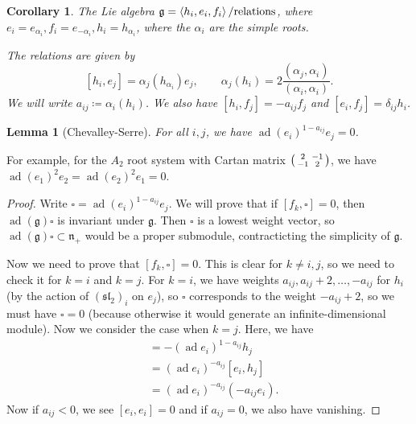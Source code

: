 \documentclass[leqno, openany]{memoir}
\newtheorem{cor}[thm]{Corollary}
\newtheorem{lem}[thm]{Lemma}
\theoremstyle{definition}
\theoremstyle{remark}
\theoremstyle{plain}
\theoremstyle{definition}
\theoremstyle{remark}
\newcommand{\mf}[1]{\mathfrak{#1}}
\DeclareMathOperator{\ad}{ad}
\begin{document}
\begin{cor} The Lie algebra $\mf{g} = \ev{h_i, e_i, f_i} / \text{relations}$,
    where $e_i = e_{\alpha_i}, f_i = e_{-\alpha_i}, h_i = h_{\alpha_i}$, where
    the $\alpha_i$ are the simple roots.

    The relations are given by \[ [h_i, e_j] = \alpha_j(h_{\alpha_i}) e_j,
    \qquad \alpha_j(h_i) = 2 \frac{(\alpha_j, \alpha_i)}{(\alpha_i, \alpha_i)}.
\] We will write $a_{ij} \coloneqq \alpha_i(h_i)$. We also have $[h_i, f_j] = -
a_{ij} f_j$ and $[e_i, f_j] = \delta_{ij} h_i$.  \end{cor}

\begin{lem}[Chevalley-Serre] For all $i,j$, we have ${\ad(e_i)}^{1-a_{ij}} e_j
= 0$.  \end{lem}

For example, for the $A_2$ root system with Cartan matrix $\begin{psmallmatrix}
2 & -1 \\ -1 & 2 \end{psmallmatrix}$, we have ${\ad(e_1)}^2 e_2 = {\ad(e_2)}^2
e_1 = 0$.

\begin{proof} Write $\square = {\ad(e_i)}^{1-a_{ij}} e_j$. We will prove that
    if $[f_k, \square] = 0$, then $\ad(\mf{g}) \square$ is invariant under
    $\mf{g}$. Then $\square$ is a lowest weight vector, so $\ad(\mf{g}) \square
    \subset \mf{n}_+$ would be a proper submodule, contracticting the
    simplicity of $\mf{g}$.

    Now we need to prove that $[f_k, \square] = 0$. This is clear for $k \neq
    i,j$, so we need to check it for $k=i$ and $k=j$. For $k=i$, we have
    weights $a_{ij}, a_{ij}+2, \ldots, -a_{ij}$ for $h_i$ (by the action of
    ${(\mf{sl}_2)}_i$ on $e_j$), so $\square$ corresponds to the weight
    $-a_{ij} + 2$, so we must have $\square = 0$ (because otherwise it would
    generate an infinite-dimensional module). Now we consider the case when
    $k=j$. Here, we have \begin{align*} [f_j, {(\ad e_i)}^{1-a_{ij}} e_j] &= -
    {(\ad e_i)}^{1-a_{ij}} h_j \\ &= {(\ad e_i)}^{-a_{ij}} [e_i, h_j] \\ &=
{(\ad e_i)}^{-a_{ij}} (-a_{ij} e_i).  \end{align*} Now if $a_{ij} < 0$, we see
$[e_i, e_i] = 0$ and if $a_{ij} = 0$, we also have vanishing.  \end{proof}
\end{document}
